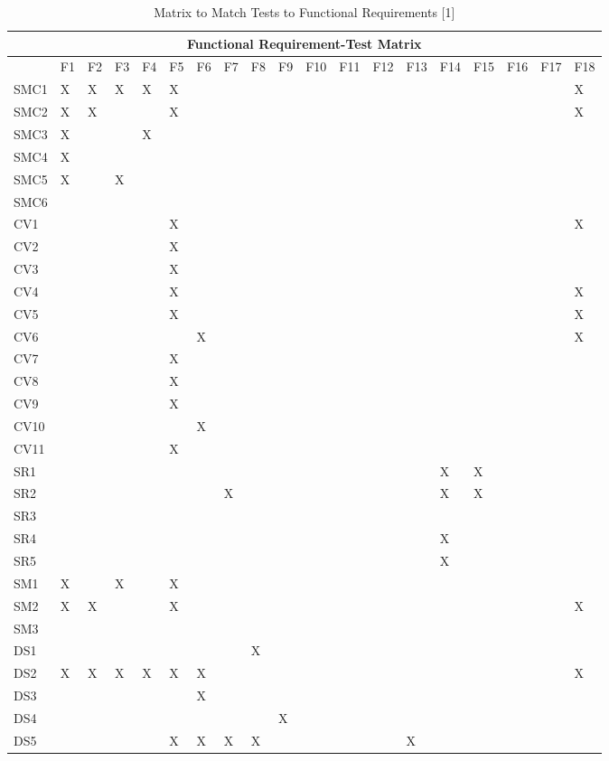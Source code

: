 \documentclass[11pt]{article}
\begin{document}
\begin{table}[H]
\centering
\caption{Matrix to Match Tests to Functional Requirements [1]}
\label{my-label}
\begin{tabular}{| l | l | l | l | l | l | l | l | l | l | l | l | l | l | l | l | l | l | l |}
\hline
\multicolumn{19}{|c|}{\textbf{Functional Requirement-Test Matrix}}                          \\ \hline
 & \tiny{F1} & \tiny{F2} & \tiny{F3} & \tiny{F4} & \tiny{F5} & \tiny{F6} & \tiny{F7} & \tiny{F8} & \tiny{F9} & \tiny{F10} & \tiny{F11} & \tiny{F12} & \tiny{F13} & \tiny{F14} & \tiny{F15} & \tiny{F16} & \tiny{F17} & \tiny{F18} \\ \hline
SMC1&X&X&X&X&X&&&&&&&&&&&&&X \\ \hline
SMC2&X&X&&&X&&&&&&&&&&&&&X \\ \hline
SMC3&X&&&X&&&&&&&&&&&&&& \\ \hline
SMC4&X&&&&&&&&&&&&&&&&& \\ \hline
SMC5&X&&X&&&&&&&&&&&&&&& \\ \hline
SMC6&&&&&&&&&&&&&&&&&& \\ \hline
CV1&&&&&X&&&&&&&&&&&&&X \\ \hline
CV2&&&&&X&&&&&&&&&&&&& \\ \hline
CV3&&&&&X&&&&&&&&&&&&& \\ \hline
CV4&&&&&X&&&&&&&&&&&&&X \\ \hline
CV5&&&&&X&&&&&&&&&&&&&X \\ \hline
CV6&&&&&&X&&&&&&&&&&&&X \\ \hline
CV7&&&&&X&&&&&&&&&&&&& \\ \hline
CV8&&&&&X&&&&&&&&&&&&& \\ \hline
CV9&&&&&X&&&&&&&&&&&&& \\ \hline
CV10&&&&&&X&&&&&&&&&&&& \\ \hline
CV11&&&&&X&&&&&&&&&&&&& \\ \hline
SR1&&&&&&&&&&&&&&X&X&&& \\ \hline
SR2&&&&&&&X&&&&&&&X&X&&& \\ \hline
SR3&&&&&&&&&&&&&&&&&& \\ \hline
SR4&&&&&&&&&&&&&&X&&&& \\ \hline
SR5&&&&&&&&&&&&&&X&&&& \\ \hline
SM1&X&&X&&X&&&&&&&&&&&&& \\ \hline
SM2&X&X&&&X&&&&&&&&&&&&&X \\ \hline
SM3&&&&&&&&&&&&&&&&&& \\ \hline
DS1&&&&&&&&X&&&&&&&&&& \\ \hline
DS2&X&X&X&X&X&X&&&&&&&&&&&&X \\ \hline
DS3&&&&&&X&&&&&&&&&&&& \\ \hline
DS4&&&&&&&&&X&&&&&&&&& \\ \hline
DS5&&&&&X&X&X&X&&&&&X&&&&& \\ \hline
\end{tabular}
\end{table}
\end{document}
